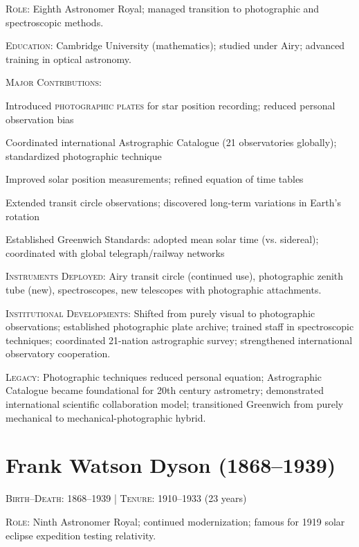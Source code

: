 \noindent\textsc{Role}: Eighth Astronomer Royal; managed transition to photographic and spectroscopic methods.

\noindent\textsc{Education}: Cambridge University (mathematics); studied under Airy; advanced training in optical astronomy.

\noindent\textsc{Major Contributions}:
\begin{enumerate*}[label=(\arabic*)]
\item Introduced \textsc{photographic plates} for star position recording; reduced personal observation bias
\item Coordinated international Astrographic Catalogue (21 observatories globally); standardized photographic technique
\item Improved solar position measurements; refined equation of time tables
\item Extended transit circle observations; discovered long-term variations in Earth's rotation
\item Established Greenwich Standards: adopted mean solar time (vs. sidereal); coordinated with global telegraph/railway networks
\end{enumerate*}

\noindent\textsc{Instruments Deployed}: Airy transit circle (continued use), photographic zenith tube (new), spectroscopes, new telescopes with photographic attachments.

\noindent\textsc{Institutional Developments}: Shifted from purely visual to photographic observations; established photographic plate archive; trained staff in spectroscopic techniques; coordinated 21-nation astrographic survey; strengthened international observatory cooperation.

\noindent\textsc{Legacy}: Photographic techniques reduced personal equation; Astrographic Catalogue became foundational for 20th century astrometry; demonstrated international scientific collaboration model; transitioned Greenwich from purely mechanical to mechanical-photographic hybrid.

\medskip

\section*{Frank Watson Dyson (1868--1939)}
\textsc{Birth--Death}: 1868--1939 | \textsc{Tenure}: 1910--1933 (23 years)

\noindent\textsc{Role}: Ninth Astronomer Royal; continued modernization; famous for 1919 solar eclipse expedition testing relativity.

